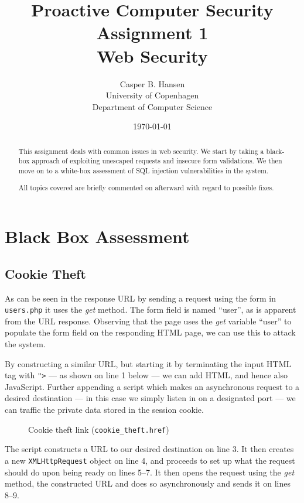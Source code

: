 \documentclass[11pt,a4paper]{article}
\title
{
    {\Large Proactive Computer Security} \\
    Assignment 1 \\
    {\large Web Security}
}
\author
{
    Casper B. Hansen \\
    University of Copenhagen \\
    Department of Computer Science
}
\date{\today}
\newcommand{\code}[1]{{\tt #1}}
\newcommand{\file}[1]{{\tt #1}}
\begin{document}
\maketitle
\begin{multicols}{2}
    \begin{abstract}
        This assignment deals with common issues in web security. We start by
        taking a black-box approach of exploiting unescaped requests and
        insecure form validations. We then move on to a white-box assessment
        of SQL injection vulnerabilities in the system.
        
        All topics covered are briefly commented on afterward with regard to
        possible fixes.
    \end{abstract}
    \columnbreak
    \tableofcontents
\end{multicols}
\thispagestyle{empty}
\clearpage

\section{Black Box Assessment}

\subsection{Cookie Theft}
As can be seen in the response URL by sending a request using the form in
\file{users.php} it uses the {\it get} method. The form field is named
``user'', as is apparent from the URL response. Observing that the page uses
the {\it get} variable ``user'' to populate the form field on the responding
HTML page, we can use this to attack the system.

By constructing a similar URL, but starting it by terminating the input HTML
tag with \code{">} --- as shown on line 1 below --- we can add HTML, and hence
also JavaScript. Further appending a script which makes an asynchronous
request to a desired destination --- in this case we simply listen in on a
designated port --- we can traffic the private data stored in the session
cookie.

\begin{figure}[H]
    
    \caption{Cookie theft link (\file{cookie\_theft.href})}
\end{figure}

The script constructs a URL to our desired destination on line 3. It then
creates a new \code{XMLHttpRequest} object on line 4, and proceeds to set up
what the request should do upon being ready on lines 5--7. It then opens the
request using the {\it get} method, the constructed URL and does so
asynchronously and sends it on lines 8--9.
\end{document}
